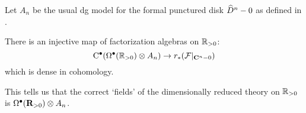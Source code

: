 Let $A_n$ be the usual dg model for the formal punctured disk $\Hat{D}^n - 0$ as defined in \cite{FHK,GWkm}.

\begin{lem}
There is an injective map of factorization algebras on $\RR_{>0}$:
\[
\clie^\bu(\Omega^\bu(\RR_{>0}) \otimes A_n) \to r_* (\cF|_{\C^n - 0}) 
\]
which is dense in cohomology.
\end{lem}

This tells us that the correct `fields' of the dimensionally reduced theory on $\RR_{>0}$ is $\Omega^\bu(\R_{>0}) \otimes A_n$. 


%
